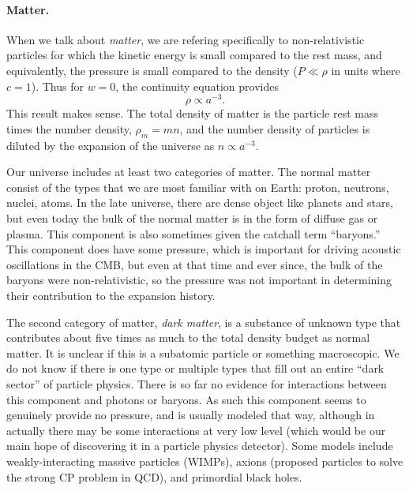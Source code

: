 \paragraph{Matter.}  When we talk about \textit{matter}, we are refering specifically to non-relativistic particles for which the kinetic energy is small compared to the rest mass, and equivalently, the pressure is small compared to the density ($P \ll \rho$ in units where $c=1$).  Thus for $w=0$, the continuity equation provides
\begin{equation}\rho \propto a^{-3}.\end{equation}
This result makes sense.  The total density of matter is the particle rest mass times the number density, $\rho_m = mn$, and the number density of particles is diluted by the expansion of the universe as $n \propto a^{-3}$.

Our universe includes at least two categories of matter.  The normal matter consist of the types that we are most familiar with on Earth: proton, neutrons, nuclei, atoms.  In the late universe, there are dense object like planets and stars, but even today the bulk of the normal matter is in the form of diffuse gas or plasma.  This component is also sometimes given the catchall term ``baryons.''  This component does have some pressure, which is important for driving acoustic oscillations in the CMB, but even at that time and ever since, the bulk of the baryons were non-relativistic, so the pressure was not important in determining their contribution to the expansion history.

The second category of matter, \textit{dark matter}, is a substance of unknown type that contributes about five times as much to the total density budget as normal matter.  It is unclear if this is a subatomic particle or something macroscopic.  We do not know if there is one type or multiple types that fill out an entire ``dark sector'' of particle physics.  There is so far no evidence for interactions between this component and photons or baryons.  As such this component seems to genuinely provide no pressure, and is usually modeled that way, although in actually there may be some interactions at very low level (which would be our main hope of discovering it in a particle physics detector).  Some models include weakly-interacting massive particles (WIMPs), axions (proposed particles to solve the strong CP problem in QCD), and primordial black holes.

